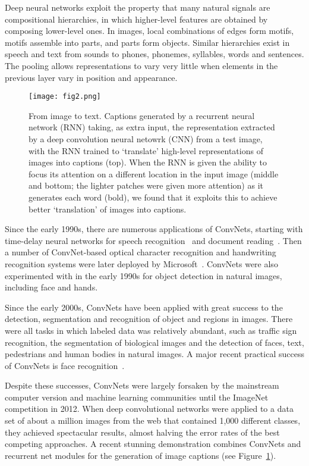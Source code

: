 \documentclass[10pt,twocolumn,letterpaper]{article}
\begin{document}
	\par
	Deep neural networks exploit the property that many natural signals are compositional hierarchies, in which higher-level features are obtained by composing lower-level ones. In  images, local combinations of edges form motifs, motifs assemble into parts, and parts form objects. Similar hierarchies exist in speech and text from sounds to phones, phonemes, syllables, words and sentences. The pooling allows representations to vary very little when elements in the previous layer vary in position and appearance.
	\begin{figure}[h]
		\centering
		\texttt{[image: fig2.png]}
		\caption{From image to text. Captions generated by a recurrent neural network (RNN) taking, as extra input, the representation extracted by a deep convolution neural netowrk (CNN) from a test image, with the RNN trained to `translate' high-level representations of images into captions (top). When the RNN is given the ability to focus its attention on a different location in the input image (middle and bottom; the lighter patches were given more attention) as it generates each word (bold), we found that it exploits this to achieve better `translation' of images into captions.} \label{fig2}
	\end{figure}
	\par
	Since the early 1990s, there are numerous applications of ConvNets, starting with time-delay neural networks for speech recognition~\cite{Alexander1995Phoneme} and document reading~\cite{L1998Gradient}. Then a number of ConvNet-based optical character recognition and handwriting recognition systems were later deployed by Microsoft~\cite{Visual03bestpractices}. ConvNets were also experimented with in the early 1990s for object detection in natural images, including face and hands.
	\par
	Since the early 2000s, ConvNets have been applied with great success to the detection, segmentation and recognition of object and regions in images. There were all tasks in which labeled data was relatively abundant, such as traffic sign recognition, the segmentation of biological images and the detection of faces, text, pedestrians and human bodies in natural images. A major recent practical success of ConvNets is face recognition~\cite{Taigman2014DeepFace}.
	\par
	Despite these successes, ConvNets were largely forsaken by the mainstream computer version and machine learning communities until the ImageNet competition in 2012. When deep convolutional
	networks were applied to a data set of about a million images from the web that contained 1,000 different classes, they achieved spectacular results, almost halving the error rates of the best competing approaches. A recent stunning demonstration combines ConvNets and recurrent net modules for the generation of image captions (see Figure~\ref{fig2}).
	{\small
		
		
	}
\end{document}

